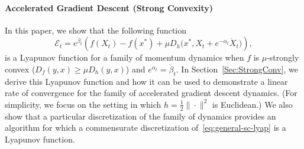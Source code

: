 \documentclass[11pt]{article}
\theoremstyle{plain}
\newcommand{\E}{{\mathcal E}}
\begin{document}
\paragraph{Accelerated Gradient Descent (Strong Convexity)}
In this paper, we show that the following function 
   \begin{equation}\label{eq:general-sc-lyap}
  \E_t =  e^{\beta_t} \left(f(X_t) - f(x^\ast) + \mu D_h\Big(x^\ast ,X_t + e^{-\alpha_t} \dot X_t\Big)\right),
 \end{equation}
is a Lyapunov function for a family of momentum dynamics when $f$ is $\mu$-strongly convex ($D_f(y,x) \geq \mu D_h(y,x)$) and $e^{\alpha_t} = \dot \beta_t$.  In Section~\ref{Sec:StrongConv}, we derive this Lyapunov function and how it can be used to demonstrate a linear rate of convergence for the family of accelerated gradient descent dynamics.  (For simplicity, we focus on the setting in which $h = \frac{1}{2}\|\cdot\|^2$ is Euclidean.) We also show that a particular discretization of the family of dynamics provides an algorithm for which a commensurate discretization of~\eqref{eq:general-sc-lyap} is a Lyapunov function.

\end{document}
